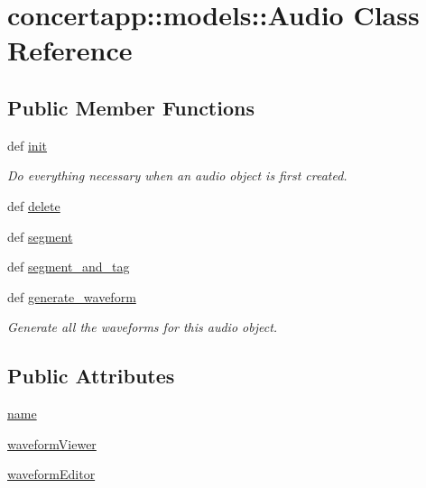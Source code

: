 \hypertarget{classconcertapp_1_1models_1_1_audio}{
\section{concertapp::models::Audio Class Reference}
\label{classconcertapp_1_1models_1_1_audio}
}
\subsection*{Public Member Functions}
\begin{DoxyCompactItemize}
\item 
def \hyperlink{classconcertapp_1_1models_1_1_audio_aa12633777cadfdef56a9763f745a0aff}{init}
\begin{DoxyCompactList}\small\item\em Do everything necessary when an audio object is first created. \item\end{DoxyCompactList}\item 
def \hyperlink{classconcertapp_1_1models_1_1_audio_ada5b258e0aa0683c00f2ec4db47f1d16}{delete}
\item 
def \hyperlink{classconcertapp_1_1models_1_1_audio_ab89924d76207710857740e3c3a6b1f7d}{segment}
\item 
def \hyperlink{classconcertapp_1_1models_1_1_audio_a09b0328c468fa28cb9a971cafdc3db9f}{segment\_\-and\_\-tag}
\item 
def \hyperlink{classconcertapp_1_1models_1_1_audio_a3934d508ef9e47ec9b0b1b64c512be7a}{generate\_\-waveform}
\begin{DoxyCompactList}\small\item\em Generate all the waveforms for this audio object. \item\end{DoxyCompactList}\end{DoxyCompactItemize}
\subsection*{Public Attributes}
\begin{DoxyCompactItemize}
\item 
\hyperlink{classconcertapp_1_1models_1_1_audio_aed3e4ca029b334a08ef5f19d9e39d901}{name}
\item 
\hyperlink{classconcertapp_1_1models_1_1_audio_afda1507435d9bd2cdbee74be5314a04b}{waveformViewer}
\item 
\hyperlink{classconcertapp_1_1models_1_1_audio_a43f9e685cebe159853fab8f326731cce}{waveformEditor}
\end{DoxyCompactItemize}
